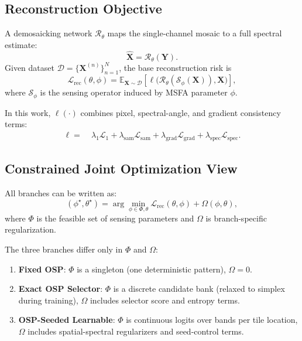 \documentclass[journal]{IEEEtran}
\begin{document}
\subsection{Reconstruction Objective}
A demosaicking network $\mathcal{R}_{\theta}$ maps the single-channel mosaic to a full spectral estimate:
\begin{equation}
\hat{\mathbf{X}}=\mathcal{R}_{\theta}(\mathbf{Y}).
\end{equation}
Given dataset $\mathcal{D}=\{\mathbf{X}^{(n)}\}_{n=1}^{N}$, the base reconstruction risk is
\begin{equation}
\mathcal{L}_{\mathrm{rec}}(\theta,\phi)=
\mathbb{E}_{\mathbf{X}\sim\mathcal{D}}
\left[
\ell\big(\mathcal{R}_{\theta}(\mathcal{S}_{\phi}(\mathbf{X})),\mathbf{X}\big)
\right],
\end{equation}
where $\mathcal{S}_{\phi}$ is the sensing operator induced by MSFA parameter $\phi$.

In this work, $\ell(\cdot)$ combines pixel, spectral-angle, and gradient consistency terms:
\begin{align}
\ell
=\;&
\lambda_{1}\mathcal{L}_{1}
+\lambda_{\mathrm{sam}}\mathcal{L}_{\mathrm{sam}}
+\lambda_{\mathrm{grad}}\mathcal{L}_{\mathrm{grad}}
+\lambda_{\mathrm{spec}}\mathcal{L}_{\mathrm{spec}}.
\label{eq:base_loss}
\end{align}

\subsection{Constrained Joint Optimization View}
All branches can be written as:
\begin{equation}
(\phi^{\star},\theta^{\star})=
\arg\min_{\phi\in\Phi,\theta}
\mathcal{L}_{\mathrm{rec}}(\theta,\phi)+\Omega(\phi,\theta),
\label{eq:joint_opt}
\end{equation}
where $\Phi$ is the feasible set of sensing parameters and $\Omega$ is branch-specific regularization.

The three branches differ only in $\Phi$ and $\Omega$:
\begin{enumerate}
\item \textbf{Fixed OSP}: $\Phi$ is a singleton (one deterministic pattern), $\Omega=0$.
\item \textbf{Exact OSP Selector}: $\Phi$ is a discrete candidate bank (relaxed to simplex during training), $\Omega$ includes selector score and entropy terms.
\item \textbf{OSP-Seeded Learnable}: $\Phi$ is continuous logits over bands per tile location, $\Omega$ includes spatial-spectral regularizers and seed-control terms.
\end{enumerate}
\end{document}
